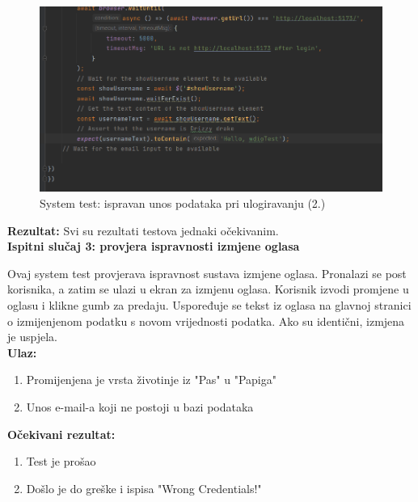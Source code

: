 			\begin{figure}[H]
				\includegraphics[scale=0.7]{slike/syslogin2.PNG} 
				\centering
				\caption{System test: ispravan unos podataka pri ulogiravanju (2.)}
				\label{syslogin2}
			\end{figure}
			
			\textbf{Rezultat:}
			Svi su rezultati testova jednaki očekivanim.\\
			
			\textbf{Ispitni slučaj 3: provjera ispravnosti izmjene oglasa}
			
			Ovaj system test provjerava ispravnost sustava izmjene oglasa. Pronalazi se post korisnika, a zatim se ulazi u ekran za izmjenu oglasa. Korisnik izvodi promjene u oglasu i klikne gumb za predaju. Uspoređuje se tekst iz oglasa na glavnoj stranici o izmijenjenom podatku s novom vrijednosti podatka. Ako su identični, izmjena je uspjela. \\
			
			\textbf{Ulaz:}
			
				\begin{enumerate}
					\item Promijenjena je vrsta životinje iz "Pas" u "Papiga"
					\item Unos e-mail-a koji ne postoji u bazi podataka
				\end{enumerate}
				
			\textbf{Očekivani rezultat:}
			
				\begin{enumerate}
					\item Test je prošao
					\item Došlo je do greške i ispisa "Wrong Credentials!"
				\end{enumerate}
			
